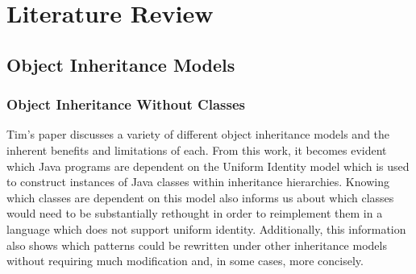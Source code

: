 \chapter{Literature Review}\label{C:us}
\section{Object Inheritance Models}
\subsection{Object Inheritance Without Classes~\cite{InheritanceWithoutClasses}}
Tim's paper discusses a variety of different object inheritance models and the inherent benefits and limitations of each. From this work, it becomes evident which Java programs are dependent on the Uniform Identity model which is used to construct instances of Java classes within inheritance hierarchies. Knowing which classes are dependent on this model also informs us about which classes would need to be substantially rethought in order to reimplement them in a language which does not support uniform identity. Additionally, this information also shows which patterns could be rewritten under other inheritance models without requiring much modification and, in some cases, more concisely.

